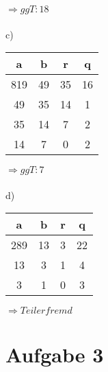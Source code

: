 \documentclass[a4paper, 10pt]{article}
\begin{document}
$\Rightarrow ggT: 18$
\\
\\
c)


\begin{center}
    \begin{tabular}{c|c|c|c} 
     \hline
     a & b & r & q \\ [0.5ex] 
     \hline\hline
     819 & 49 & 35 & 16 \\ 
     \hline
     49 & 35 & 14 & 1 \\
     \hline
     35 & 14 & 7 & 2 \\
     \hline
     14 & 7 & 0 & 2 \\
     \hline
    \end{tabular}
\end{center}


$\Rightarrow ggT: 7$
\\
\\
d)


\begin{center}
    \begin{tabular}{c|c|c|c} 
     \hline
     a & b & r & q \\ [0.5ex] 
     \hline\hline
     289 & 13 & 3 & 22 \\ 
     \hline
     13 & 3 & 1 & 4 \\
     \hline
     3 & 1 & 0 & 3 \\
     \hline
    \end{tabular}
\end{center}

$\Rightarrow Teilerfremd$

\section*{Aufgabe 3}
\end{document}
